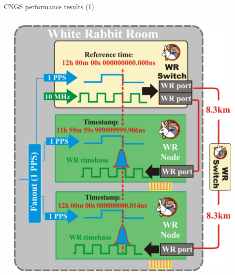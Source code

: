 \documentclass[compress,red]{beamer}
\begin{document}
\begin{frame}{CNGS performance results (1)}
\begin{columns}[c]
\begin{center}

	  \end{center}
		\begin{center}
		\includegraphics[width=0.93\textwidth]{measurements/performance_testing_setup-detail_v2.pdf}
		
		
		\end{center}
  \end{columns}


\end{frame}
\end{document}
